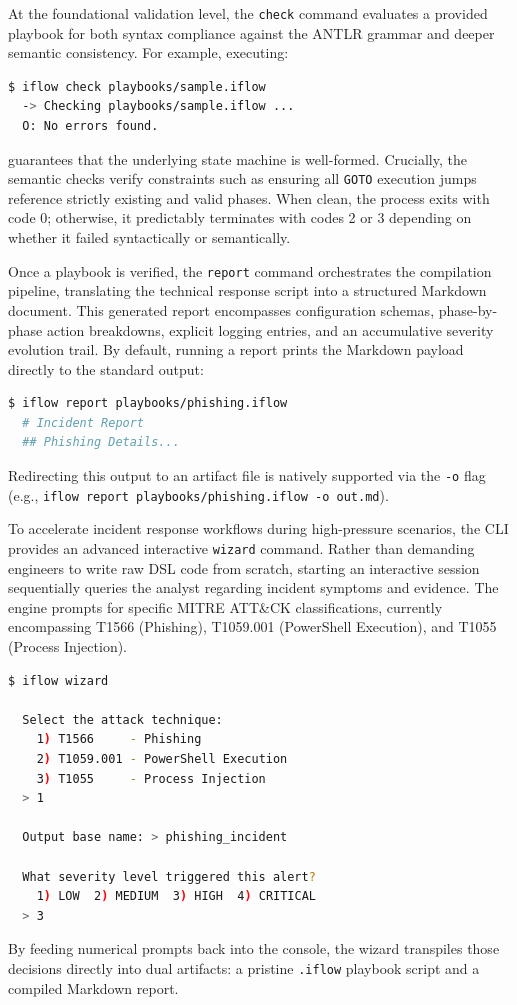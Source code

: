 At the foundational validation level, the \texttt{check} command evaluates a provided playbook for both syntax compliance against the ANTLR grammar and deeper semantic consistency. For example, executing:
\begin{lstlisting}[language=bash]
$ iflow check playbooks/sample.iflow
  -> Checking playbooks/sample.iflow ...
  O: No errors found.
\end{lstlisting}
guarantees that the underlying state machine is well-formed. Crucially, the semantic checks verify constraints such as ensuring all \texttt{GOTO} execution jumps reference strictly existing and valid phases. When clean, the process exits with code 0; otherwise, it predictably terminates with codes 2 or 3 depending on whether it failed syntactically or semantically.

Once a playbook is verified, the \texttt{report} command orchestrates the compilation pipeline, translating the technical response script into a structured Markdown document. This generated report encompasses configuration schemas, phase-by-phase action breakdowns, explicit logging entries, and an accumulative severity evolution trail. By default, running a report prints the Markdown payload directly to the standard output:
\begin{lstlisting}[language=bash]
$ iflow report playbooks/phishing.iflow
  # Incident Report
  ## Phishing Details...
\end{lstlisting}
Redirecting this output to an artifact file is natively supported via the \texttt{-o} flag (e.g., \texttt{iflow report playbooks/phishing.iflow -o out.md}).

To accelerate incident response workflows during high-pressure scenarios, the CLI provides an advanced interactive \texttt{wizard} command. Rather than demanding engineers to write raw DSL code from scratch, starting an interactive session sequentially queries the analyst regarding incident symptoms and evidence. The engine prompts for specific MITRE ATT\&CK classifications, currently encompassing T1566 (Phishing), T1059.001 (PowerShell Execution), and T1055 (Process Injection).

\begin{lstlisting}[language=bash]
$ iflow wizard

  Select the attack technique:
    1) T1566     - Phishing
    2) T1059.001 - PowerShell Execution
    3) T1055     - Process Injection
  > 1

  Output base name: > phishing_incident

  What severity level triggered this alert?
    1) LOW  2) MEDIUM  3) HIGH  4) CRITICAL
  > 3
\end{lstlisting}
By feeding numerical prompts back into the console, the wizard transpiles those decisions directly into dual artifacts: a pristine \texttt{.iflow} playbook script and a compiled Markdown report.

